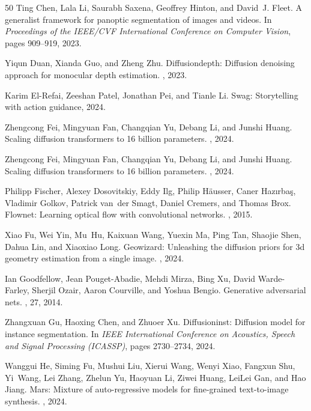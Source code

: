 \documentclass[manuscript,screen,review]{acmart}
\begin{document}
\begin{thebibliography}{50}
Ting Chen, Lala Li, Saurabh Saxena, Geoffrey Hinton, and David~J. Fleet.
\newblock A generalist framework for panoptic segmentation of images and videos.
\newblock In {\em Proceedings of the IEEE/CVF International Conference on Computer Vision}, pages 909--919, 2023.

Yiqun Duan, Xianda Guo, and Zheng Zhu.
\newblock Diffusiondepth: Diffusion denoising approach for monocular depth estimation.
, 2023.

Karim El-Refai, Zeeshan Patel, Jonathan Pei, and Tianle Li.
\newblock Swag: Storytelling with action guidance, 2024.

Zhengcong Fei, Mingyuan Fan, Changqian Yu, Debang Li, and Junshi Huang.
\newblock Scaling diffusion transformers to 16 billion parameters.
, 2024.

Zhengcong Fei, Mingyuan Fan, Changqian Yu, Debang Li, and Junshi Huang.
\newblock Scaling diffusion transformers to 16 billion parameters.
, 2024.

Philipp Fischer, Alexey Dosovitskiy, Eddy Ilg, Philip H{\"a}usser, Caner Haz{\i}rba{\c{s}}, Vladimir Golkov, Patrick van~der Smagt, Daniel Cremers, and Thomas Brox.
\newblock Flownet: Learning optical flow with convolutional networks.
, 2015.

Xiao Fu, Wei Yin, Mu~Hu, Kaixuan Wang, Yuexin Ma, Ping Tan, Shaojie Shen, Dahua Lin, and Xiaoxiao Long.
\newblock Geowizard: Unleashing the diffusion priors for 3d geometry estimation from a single image.
, 2024.

Ian Goodfellow, Jean Pouget-Abadie, Mehdi Mirza, Bing Xu, David Warde-Farley, Sherjil Ozair, Aaron Courville, and Yoshua Bengio.
\newblock Generative adversarial nets.
, 27, 2014.

Zhangxuan Gu, Haoxing Chen, and Zhuoer Xu.
\newblock Diffusioninst: Diffusion model for instance segmentation.
\newblock In {\em IEEE International Conference on Acoustics, Speech and Signal Processing (ICASSP)}, pages 2730--2734, 2024.

Wanggui He, Siming Fu, Mushui Liu, Xierui Wang, Wenyi Xiao, Fangxun Shu, Yi~Wang, Lei Zhang, Zhelun Yu, Haoyuan Li, Ziwei Huang, LeiLei Gan, and Hao Jiang.
\newblock Mars: Mixture of auto-regressive models for fine-grained text-to-image synthesis.
, 2024.


\end{thebibliography}
\end{document}
